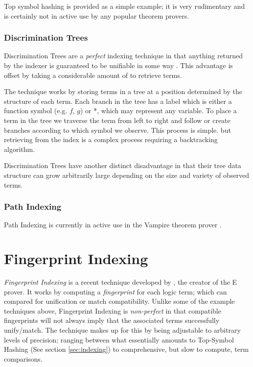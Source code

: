 Top symbol hashing is provided as a simple example; it is very rudimentary and
is certainly not in active use by any popular theorem provers.

\subsubsection{Discrimination Trees}

Discrimination Trees are a \emph{perfect} indexing technique in that anything
returned by the indexer is guaranteed to be unifiable in some way \cite{mccune}. This advantage
is offset by taking a considerable amount of to retrieve terms.

The technique works by storing terms in a tree at a position determined by the structure
of each term. Each branch in the tree has a label which is either a function symbol
(e.g. $f$, $g$) or *, which may represent any variable. To place a term in the tree
we traverse the term from left to right and follow or create branches according to
which symbol we observe. This process is simple. but retrieving from the index is a
complex process requiring a backtracking algorithm.

Discrimination Trees have another distinct disadvantage in that their tree data
structure can grow arbitrarily large depending on the size and variety of observed terms.

\subsubsection{Path Indexing}

Path Indexing is currently in active use in the Vampire theorem prover \cite{vampire}.

\section{Fingerprint Indexing}
\label{sec:fingerprint}

\emph{Fingerprint Indexing} is a recent technique developed by , the creator
of the E prover. It works by computing a \emph{fingerprint} for each logic term;
which can compared for unification or match compatibility. 
Unlike some of the example techniques above,
Fingerprint Indexing is \emph{non-perfect} in that compatible fingerprints will not
always imply that the associated terms successfully unify/match. The technique
makes up for this by being adjustable to arbitrary levels of precision; ranging between
what essentially amounts to Top-Symbol Hashing (See section \ref{sec:indexing})
to comprehensive, but slow to compute, term comparisons.

